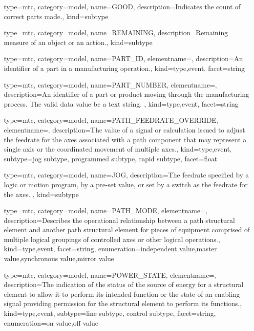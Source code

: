 {
  type=mtc,
  category=model,
  name={GOOD},
  description={Indicates the count of correct parts made.},
  kind={subtype}
}


{
  type=mtc,
  category=model,
  name={REMAINING},
  description={Remaining measure of an object or an action.},
  kind={subtype}
}


{
  type=mtc,
  category=model,
  name={PART\_ID},
  elementname=,
  description={An identifier of a part in a manufacturing operation.},
  kind={type,event},
  facet={\gls{string}}
}


{
  type=mtc,
  category=model,
  name={PART\_NUMBER},
  elementname=,
  description={An identifier of a part or product moving through the manufacturing process. \newline The \gls{valid data value} \must be a text string. },
  kind={type,event},
  facet={\gls{string}}
}


{
  type=mtc,
  category=model,
  name={PATH\_FEEDRATE\_OVERRIDE},
  elementname=,
  description={The value of a signal or calculation issued to adjust the feedrate for the axes associated with a \gls{path} component that may represent a single axis or the coordinated movement of multiple axes.},
  kind={type,event},
  subtype={\gls{jog subtype}, \gls{programmed subtype}, \gls{rapid subtype}},
  facet={\gls{float}}
}


{
  type=mtc,
  category=model,
  name={JOG},
  description={The feedrate specified by a logic or motion program, by a pre-set value, or set by a switch as the feedrate for the \gls{axes}. },
  kind={subtype}
}


{
  type=mtc,
  category=model,
  name={PATH\_MODE},
  elementname=,
  description={Describes the operational relationship between a \gls{path} \gls{structural element} and another \gls{path} \gls{structural element} for pieces of equipment comprised of multiple logical groupings of controlled axes or other logical operations.},
  kind={type,event},
  facet={\gls{string}},
  enumeration={\gls{independent value},\gls{master value},\gls{synchronous value},\gls{mirror value}}
}


{
  type=mtc,
  category=model,
  name={POWER\_STATE},
  elementname=,
  description={The indication of the status of the source of energy for a \gls{structural element} to allow it to perform its intended function or the state of an enabling signal providing permission for the \gls{structural element} to perform its functions.},
  kind={type,event},
  subtype={\gls{line subtype}, \gls{control subtype}},
  facet={\gls{string}},
  enumeration={\gls{on value},\gls{off value}}
}


